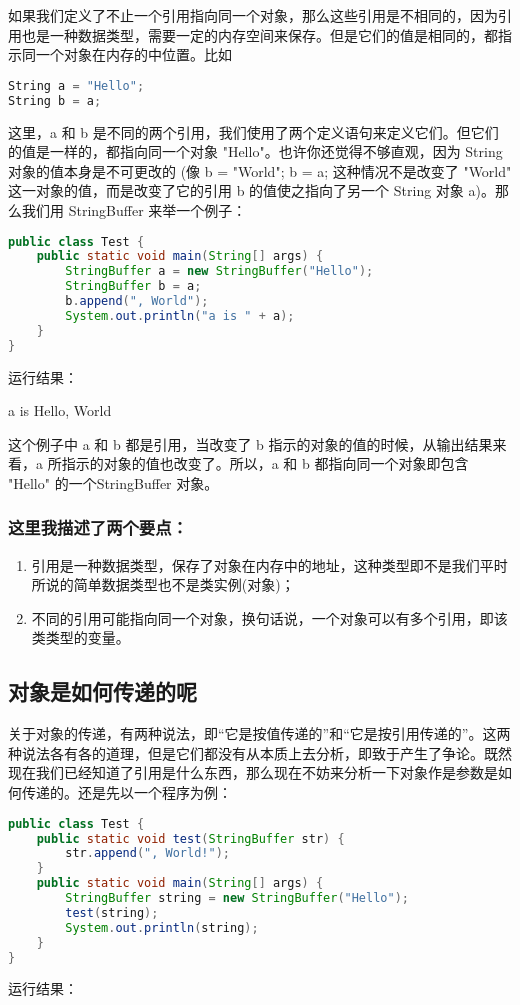 \documentclass[10pt,b5paper]{article}
\begin{document}
如果我们定义了不止一个引用指向同一个对象，那么这些引用是不相同的，因为引用也是一种数据类型，需要一定的内存空间来保存。但是它们的值是相同的，都指示同一个对象在内存的中位置。比如
\begin{lstlisting}[language=c++]
String a = "Hello"; 
String b = a;
\end{lstlisting}

这里，a 和 b 是不同的两个引用，我们使用了两个定义语句来定义它们。但它们的值是一样的，都指向同一个对象 "Hello"。也许你还觉得不够直观，因为 String 对象的值本身是不可更改的 (像 b = "World"; b = a; 这种情况不是改变了 "World" 这一对象的值，而是改变了它的引用 b 的值使之指向了另一个 String 对象 a)。那么我们用 StringBuffer 来举一个例子：
\begin{lstlisting}[language=java]
public class Test { 
    public static void main(String[] args) { 
        StringBuffer a = new StringBuffer("Hello"); 
        StringBuffer b = a; 
        b.append(", World"); 
        System.out.println("a is " + a); 
    } 
} 
\end{lstlisting}
运行结果： 

a is Hello, World

这个例子中 a 和 b 都是引用，当改变了 b 指示的对象的值的时候，从输出结果来看，a 所指示的对象的值也改变了。所以，a 和 b 都指向同一个对象即包含 "Hello" 的一个StringBuffer 对象。

\subsubsection{这里我描述了两个要点：}
\label{sec-1-2-1}

\begin{enumerate}
\item 引用是一种数据类型，保存了对象在内存中的地址，这种类型即不是我们平时所说的简单数据类型也不是类实例(对象)；

\item 不同的引用可能指向同一个对象，换句话说，一个对象可以有多个引用，即该类类型的变量。
\end{enumerate}
\subsection{对象是如何传递的呢}
\label{sec-1-3}

关于对象的传递，有两种说法，即“它是按值传递的”和“它是按引用传递的”。这两种说法各有各的道理，但是它们都没有从本质上去分析，即致于产生了争论。既然现在我们已经知道了引用是什么东西，那么现在不妨来分析一下对象作是参数是如何传递的。还是先以一个程序为例：
\begin{lstlisting}[language=java]
public class Test { 
    public static void test(StringBuffer str) { 
        str.append(", World!"); 
    } 
    public static void main(String[] args) { 
        StringBuffer string = new StringBuffer("Hello"); 
        test(string); 
        System.out.println(string); 
    } 
} 
\end{lstlisting}
运行结果： 
\end{document}

